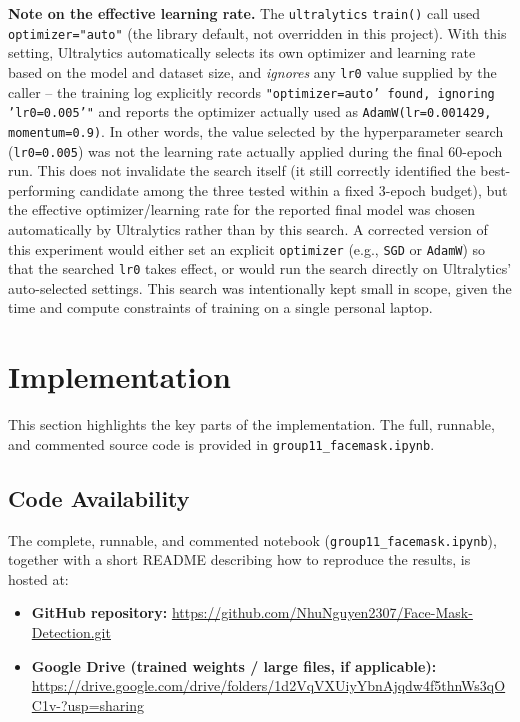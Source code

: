 \documentclass[12pt]{article}
\begin{document}
\textbf{Note on the effective learning rate.} The \texttt{ultralytics}
\texttt{train()} call used \texttt{optimizer="auto"} (the library default,
not overridden in this project). With this setting, Ultralytics
automatically selects its own optimizer and learning rate based on the
model and dataset size, and \emph{ignores} any \texttt{lr0} value supplied
by the caller -- the training log explicitly records
\texttt{"optimizer=auto' found, ignoring 'lr0=0.005'"} and reports the
optimizer actually used as \texttt{AdamW(lr=0.001429, momentum=0.9)}. In
other words, the value selected by the hyperparameter search
(\texttt{lr0=0.005}) was not the learning rate actually applied during the
final 60-epoch run. This does not invalidate the search itself (it still
correctly identified the best-performing candidate among the three tested
within a fixed 3-epoch budget), but the effective optimizer/learning rate
for the reported final model was chosen automatically by Ultralytics rather
than by this search. A corrected version of this experiment would either
set an explicit \texttt{optimizer} (e.g., \texttt{SGD} or \texttt{AdamW})
so that the searched \texttt{lr0} takes effect, or would run the search
directly on Ultralytics' auto-selected settings. This search was
intentionally kept small in scope, given the time and compute constraints of
training on a single personal laptop.

\section{Implementation}

This section highlights the key parts of the implementation. The full,
runnable, and commented source code is provided in
\texttt{group11\_facemask.ipynb}.

\subsection{Code Availability}
The complete, runnable, and commented notebook
(\texttt{group11\_facemask.ipynb}), together with a short README describing
how to reproduce the results, is hosted at:
\begin{itemize}[noitemsep]
    \item \textbf{GitHub repository:} \url{https://github.com/NhuNguyen2307/Face-Mask-Detection.git}
    \item \textbf{Google Drive (trained weights / large files, if applicable):} \url{https://drive.google.com/drive/folders/1d2VqVXUiyYbnAjqdw4f5thnWs3qOC1v-?usp=sharing}
\end{itemize}
\end{document}
